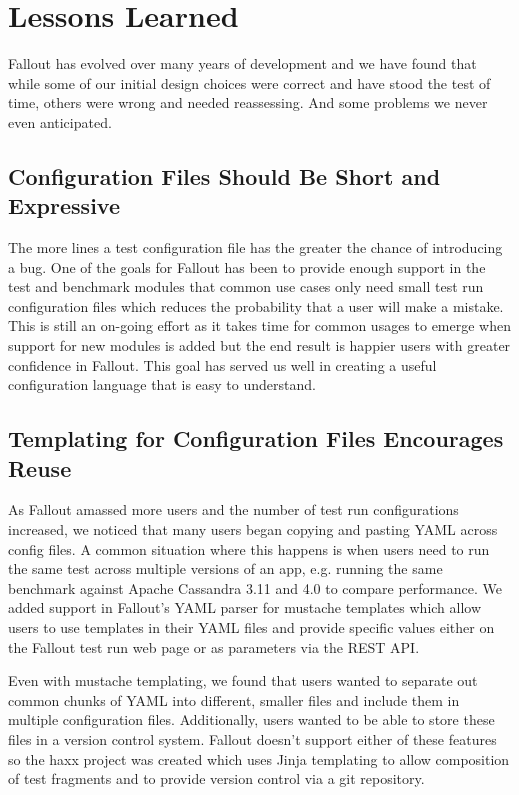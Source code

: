 \documentclass[a4paper,fleqn]{cas-dc}
\begin{document}
\section{Lessons Learned}\label{lessons}

Fallout has evolved over many years of development and we have found that while some of our initial
design choices were correct and have stood the test of time, others were wrong and needed
reassessing. And some problems we never even anticipated.

\subsection{Configuration Files Should Be Short and Expressive}

The more lines a test configuration file has the greater the chance of introducing a bug. One of the
goals for Fallout has been to provide enough support in the test and benchmark modules that
common use cases only need small test run configuration files which reduces the probability that a
user will make a mistake. This is still an on-going effort as it takes time for common usages to
emerge when support for new modules is added but the end result is happier users with greater
confidence in Fallout. This goal has served us well in creating a useful configuration language that
is easy to understand.

\subsection{Templating for Configuration Files Encourages Reuse}

As Fallout amassed more users and the number of test run configurations increased, we noticed that
many users began copying and pasting YAML across config files. A common situation where this happens
is when users need to run the same test across multiple versions of an app, e.g. running the same
benchmark against Apache Cassandra 3.11 and 4.0 to compare performance. We added support in
Fallout’s YAML parser for mustache \cite{MUSTACHE} templates which allow users to use templates in their
YAML files and provide specific values either on the Fallout test run web page or as parameters via
the REST API.

Even with mustache templating, we found that users wanted to separate out common chunks of YAML into
different, smaller files and include them in multiple configuration files. Additionally, users wanted
to be able to store these files in a version control system. Fallout doesn’t support either of these
features so the haxx project was created which uses Jinja \cite{JINJA} templating to allow composition of
test fragments and to provide version control via a git repository.
\end{document}
